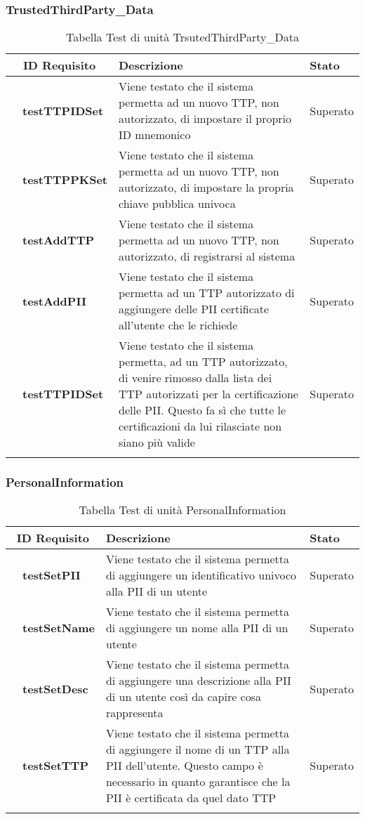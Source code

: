 \subsubsection{TrustedThirdParty\_Data}
\begin{longtable}{|r l|p{10cm}|p{2cm}|}
	\hline
	\multicolumn{2}{|c|}{\textbf{ID Requisito}} & \textbf{Descrizione} & \textbf{Stato}\tabularnewline
	\hline
	&\textbf{testTTPIDSet}&Viene testato che il sistema permetta ad un nuovo \gls{TTP}, non autorizzato, di impostare il proprio ID mnemonico & Superato\\\hline
	&\textbf{testTTPPKSet}&Viene testato che il sistema permetta ad un nuovo \gls{TTP}, non autorizzato, di impostare la propria chiave pubblica univoca & Superato\\\hline
	&\textbf{testAddTTP}&Viene testato che il sistema permetta ad un nuovo TTP, non autorizzato, di registrarsi al sistema& Superato\\\hline
	&\textbf{testAddPII}&Viene testato che il sistema permetta ad un \gls{TTP} autorizzato di aggiungere delle \gls{PII} certificate all'utente che le richiede& Superato\\\hline
	&\textbf{testTTPIDSet}&Viene testato che il sistema permetta, ad un \gls{TTP} autorizzato, di venire rimosso dalla lista dei \gls{TTP} autorizzati per la certificazione delle \gls{PII}. Questo fa sì che tutte le certificazioni da lui rilasciate non siano più valide& Superato\\\hline
	\caption{Tabella Test di unità TrsutedThirdParty\_Data}
\end{longtable}
\subsubsection{PersonalInformation}
\begin{longtable}{|r l|p{10cm}|p{2cm}|}
	\hline
	\multicolumn{2}{|c|}{\textbf{ID Requisito}} & \textbf{Descrizione} & \textbf{Stato}\tabularnewline
	\hline
	&\textbf{testSetPII}&Viene testato che il sistema permetta di aggiungere un identificativo univoco alla \gls{PII} di un utente& Superato\\\hline
	&\textbf{testSetName}&Viene testato che il sistema permetta di aggiungere un nome alla \gls{PII} di un utente& Superato\\\hline
	&\textbf{testSetDesc}&Viene testato che il sistema permetta di aggiungere una descrizione alla \gls{PII} di un utente così da capire cosa rappresenta& Superato\\\hline
	&\textbf{testSetTTP}&Viene testato che il sistema permetta di aggiungere il nome di un \gls{TTP} alla \gls{PII} dell'utente. Questo campo è necessario in quanto garantisce che la \gls{PII} è certificata da quel dato \gls{TTP}& Superato\\\hline
	\caption{Tabella Test di unità PersonalInformation}
\end{longtable}
